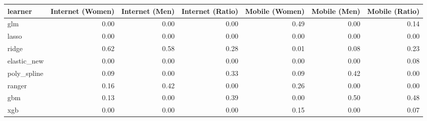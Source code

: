 \begin{table}[ht]
\centering
\begin{tabular}{lrrrrrr}
  \toprule
learner & Internet (Women) & Internet (Men) & Internet (Ratio) & Mobile (Women) & Mobile (Men) & Mobile (Ratio) \\ 
  \midrule
glm & 0.00 & 0.00 & 0.00 & 0.49 & 0.00 & 0.14 \\ 
  lasso & 0.00 & 0.00 & 0.00 & 0.00 & 0.00 & 0.00 \\ 
  ridge & 0.62 & 0.58 & 0.28 & 0.01 & 0.08 & 0.23 \\ 
  elastic\_new & 0.00 & 0.00 & 0.00 & 0.00 & 0.00 & 0.08 \\ 
  poly\_spline & 0.09 & 0.00 & 0.33 & 0.09 & 0.42 & 0.00 \\ 
  ranger & 0.16 & 0.42 & 0.00 & 0.26 & 0.00 & 0.00 \\ 
  gbm & 0.13 & 0.00 & 0.39 & 0.00 & 0.50 & 0.48 \\ 
  xgb & 0.00 & 0.00 & 0.00 & 0.15 & 0.00 & 0.07 \\ 
   \bottomrule
\end{tabular}
\end{table}
